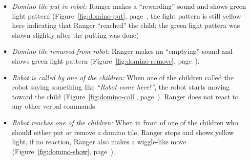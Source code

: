 \documentclass{sig-alternate}
\begin{document}
\begin{itemize}

    \item \emph{Domino tile put in robot:} Ranger makes a ``rewarding'' sound
        and shows green light pattern (Figure~\ref{fig:domino-put},
        page~\pageref{fig:domino-put}, the light pattern is still yellow here
        indicating that Ranger ``reached'' the child; the green light pattern
        was shown slightly after the putting was done)

    \item \emph{Domino tile removed from robot:} Ranger makes an ``emptying''
        sound and shows green light pattern (Figure~\ref{fig:domino-remove},
        page~\pageref{fig:domino-remove}).



    \item \emph{Robot is called by one of the children:} When one of the
        children called the robot saying something like \textit{``Robot come
        here!''}, the robot starts moving toward the child
        (Figure~\ref{fig:domino-call}, page~\pageref{fig:domino-call}). Ranger
        does not react to any other verbal commands.	

    \item \emph{Robot reaches one of the children:} When in front of one of the
        children who should either put or remove a domino tile, Ranger stops and
        shows yellow light, if no reaction, Ranger also makes a wiggle-like move
        (Figure~\ref{fig:domino-show}, page~\pageref{fig:domino-show}).

\end{itemize}
\end{document}
